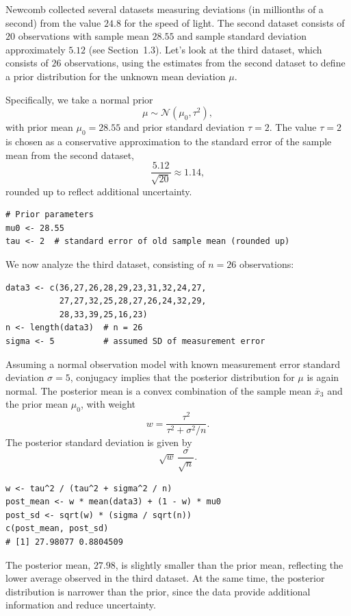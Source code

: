 \begin{ex}

Newcomb collected several datasets measuring deviations (in millionths of a second) from the value $24.8$ for the speed of light. 
The second dataset consists of $20$ observations with sample mean $28.55$ and sample standard deviation approximately $5.12$ (see Section~1.3). 
Let's look at the third dataset, which consists of $26$ observations, using the estimates from the second dataset to define a prior distribution for the unknown mean deviation $\mu$. 

Specifically, we take a normal prior
\[
\mu \sim \mathcal{N}(\mu_0, \tau^2),
\]
with prior mean $\mu_0 = 28.55$ and prior standard deviation $\tau = 2$. 
The value $\tau = 2$ is chosen as a conservative approximation to the standard error of the sample mean from the second dataset,
\[
\frac{5.12}{\sqrt{20}} \approx 1.14,
\]
rounded up to reflect additional uncertainty.

\begin{verbatim}
# Prior parameters
mu0 <- 28.55
tau <- 2  # standard error of old sample mean (rounded up)
\end{verbatim}

We now analyze the third dataset, consisting of $n = 26$ observations:

\begin{verbatim}
data3 <- c(36,27,26,28,29,23,31,32,24,27,
           27,27,32,25,28,27,26,24,32,29,
           28,33,39,25,16,23)
n <- length(data3)  # n = 26
sigma <- 5          # assumed SD of measurement error
\end{verbatim}

Assuming a normal observation model with known measurement error standard deviation $\sigma = 5$, conjugacy implies that the posterior distribution for $\mu$ is again normal. 
The posterior mean is a convex combination of the sample mean $\bar{x}_3$ and the prior mean $\mu_0$, with weight
\[
w = \frac{\tau^2}{\tau^2 + \sigma^2 / n}.
\]
The posterior standard deviation is given by
\[
\sqrt{w}\,\frac{\sigma}{\sqrt{n}}.
\]

\begin{verbatim}
w <- tau^2 / (tau^2 + sigma^2 / n)
post_mean <- w * mean(data3) + (1 - w) * mu0
post_sd <- sqrt(w) * (sigma / sqrt(n))
c(post_mean, post_sd)
# [1] 27.98077 0.8804509
\end{verbatim}

The posterior mean, $27.98$, is slightly smaller than the prior mean, reflecting the lower average observed in the third dataset. 
At the same time, the posterior distribution is narrower than the prior, since the data provide additional information and reduce uncertainty.


\end{ex}
